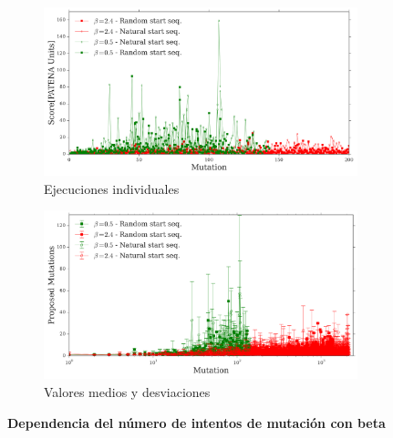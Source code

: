 \begin{figure}[htbp]
  \begin{subfigure}[b]{\textwidth}
    \includegraphics[width=\textwidth]{img/resultados/iterationVsMutAttempts-individual.png}
    \caption{Ejecuciones individuales}
    \label{fig:mutAttemptsVsite-a}
  \end{subfigure}
  \begin{subfigure}[b]{\textwidth}
      \includegraphics[width=\textwidth]{img/resultados/iterationVsMutAttempts-mean.png}
    \caption{Valores medios y desviaciones}
  \label{fig:mutAttemptsVsite-b}
  \end{subfigure}
  \caption{\textbf{Dependencia del número de intentos de mutación con beta}}
  \label{fig:mutAttemptsVsite}
\end{figure}









